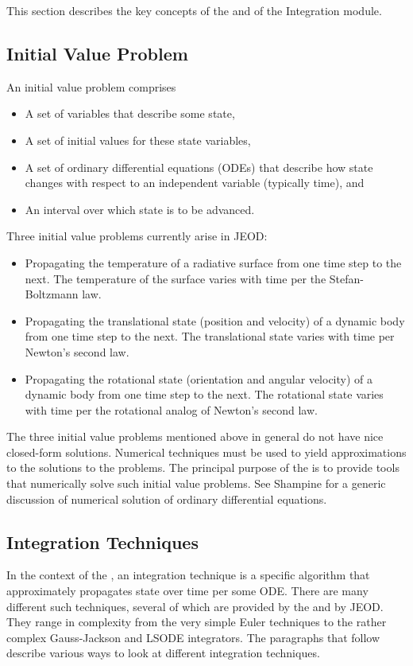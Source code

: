 This section describes the key concepts of the \ModelDesc and of the 
\erseven Integration module.

\subsection{Initial Value Problem}
An initial value problem comprises 
\begin{itemize}
\item A set of variables that describe some state,
\item A set of initial values for these state variables,
\item A set of ordinary differential equations (ODEs) that describe how state
  changes with respect to an independent variable (typically time), and
\item An interval over which state is to be advanced.
\end{itemize}

Three initial value problems currently arise in JEOD:
\begin{itemize}
\item Propagating the temperature of a radiative surface
  from one time step to the next.
  The temperature of the surface varies with time per the
  Stefan-Boltzmann law.
\item Propagating the translational state (position and velocity) of a
  dynamic body from one time step to the next.
  The translational state varies with time per Newton's second law.
\item Propagating the rotational state (orientation and angular velocity) of a
  dynamic body from one time step to the next.
  The rotational state varies with time per the rotational analog of
  Newton's second law.
\end{itemize}

The three initial value problems mentioned above in general do not have nice
closed-form solutions. Numerical techniques must be used to yield approximations
to the solutions to the problems.
The principal purpose of the \ModelDesc is to provide tools that
numerically solve such initial value problems.
See Shampine\cite{shampine:1994} for a generic discussion of numerical
solution of ordinary differential equations.

\subsection{Integration Techniques}

In the context of the \ModelDesc, an integration technique is a specific
algorithm that approximately propagates state over time per some ODE.
There are many different such techniques, several of which
are provided by the \erseven and by JEOD. They range in
complexity from the very simple Euler techniques to the rather complex
Gauss-Jackson and LSODE integrators. The paragraphs that follow describe
various ways to look at different integration techniques.

